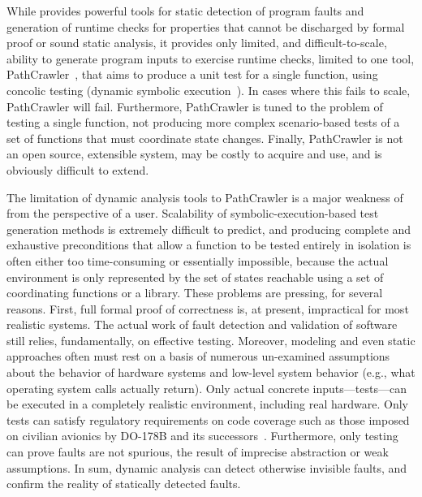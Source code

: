 While \framac{} provides powerful tools for static detection of program faults and generation of runtime checks for properties that cannot be discharged by formal proof or sound static analysis, it provides only limited, and difficult-to-scale, ability to generate program inputs to exercise runtime checks, limited to one tool, PathCrawler~\cite{WilliamsMMR05EDCC}, that aims to produce a unit test for a single function, using concolic testing (dynamic symbolic execution~\cite{GodefroidKS05}).  In cases where this fails to scale, PathCrawler will fail.  Furthermore, PathCrawler is tuned to the problem of testing a single function, not producing more complex scenario-based tests of a set of functions that must coordinate state changes.  Finally, PathCrawler is not an open source, extensible system, may be costly to acquire and use, and is obviously difficult to extend.

The limitation of dynamic analysis tools to PathCrawler is a major weakness of \framac from the perspective of a user.  Scalability of symbolic-execution-based test generation methods is extremely difficult to predict, and producing complete and exhaustive preconditions that allow a function to be tested entirely in isolation is often either too time-consuming or essentially impossible, because the actual environment is only represented by the set of states reachable using a set of coordinating functions or a library.  These problems are pressing, for several reasons.  First, full formal proof of correctness is, at present, impractical for most realistic systems.  The actual work of fault detection and validation of software still relies, fundamentally, on effective testing.  Moreover, modeling and even static approaches often must rest on a basis of numerous un-examined assumptions about the behavior of hardware systems and low-level system behavior (e.g., what operating system calls actually return).  Only actual concrete inputs---tests---can be executed in a completely realistic environment, including real hardware.  Only tests can satisfy regulatory requirements on code coverage such as those imposed on civilian avionics by DO-178B and its successors~\cite{MCDC}.  Furthermore, only testing can prove faults are not spurious, the result of imprecise abstraction or weak assumptions.
In sum, dynamic analysis can detect otherwise invisible faults, and confirm the reality of statically detected faults.

